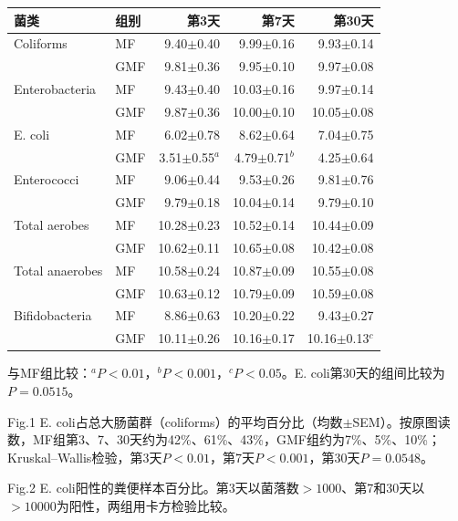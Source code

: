\begin{center}\small\setlength{\tabcolsep}{3.5pt}\renewcommand{\arraystretch}{1.18}\begin{tabular}{@{}llrrr@{}}
\toprule
菌类 & 组别 & 第3天 & 第7天 & 第30天 \\
\midrule
Coliforms & MF & 9.40\(\pm\)0.40 & 9.99\(\pm\)0.16 & 9.93\(\pm\)0.14 \\
 & GMF & 9.81\(\pm\)0.36 & 9.95\(\pm\)0.10 & 9.97\(\pm\)0.08 \\
Enterobacteria & MF & 9.43\(\pm\)0.40 & 10.03\(\pm\)0.16 & 9.97\(\pm\)0.14 \\
 & GMF & 9.87\(\pm\)0.36 & 10.00\(\pm\)0.10 & 10.05\(\pm\)0.08 \\
E. coli & MF & 6.02\(\pm\)0.78 & 8.62\(\pm\)0.64 & 7.04\(\pm\)0.75 \\
 & GMF & 3.51\(\pm\)0.55\(^{a}\) & 4.79\(\pm\)0.71\(^{b}\) & 4.25\(\pm\)0.64 \\
Enterococci & MF & 9.06\(\pm\)0.44 & 9.53\(\pm\)0.26 & 9.81\(\pm\)0.76 \\
 & GMF & 9.79\(\pm\)0.18 & 10.04\(\pm\)0.14 & 9.79\(\pm\)0.10 \\
Total aerobes & MF & 10.28\(\pm\)0.23 & 10.52\(\pm\)0.14 & 10.44\(\pm\)0.09 \\
 & GMF & 10.62\(\pm\)0.11 & 10.65\(\pm\)0.08 & 10.42\(\pm\)0.08 \\
Total anaerobes & MF & 10.58\(\pm\)0.24 & 10.87\(\pm\)0.09 & 10.55\(\pm\)0.08 \\
 & GMF & 10.63\(\pm\)0.12 & 10.79\(\pm\)0.09 & 10.59\(\pm\)0.08 \\
Bifidobacteria & MF & 8.86\(\pm\)0.63 & 10.20\(\pm\)0.22 & 9.43\(\pm\)0.27 \\
 & GMF & 10.11\(\pm\)0.26 & 10.16\(\pm\)0.17 & 10.16\(\pm\)0.13\(^{c}\) \\
\bottomrule\end{tabular}\end{center}

与MF组比较：\(^{a}P<0.01\)，\(^{b}P<0.001\)，\(^{c}P<0.05\)。E. coli第30天的组间比较为\(P=0.0515\)。

Fig.1 \quad E. coli占总大肠菌群（coliforms）的平均百分比（均数\(\pm\)SEM）。按原图读数，MF组第3、7、30天约为42\%、61\%、43\%，GMF组约为7\%、5\%、10\%；Kruskal--Wallis检验，第3天\(P<0.01\)，第7天\(P<0.001\)，第30天\(P=0.0548\)。

Fig.2 \quad E. coli阳性的粪便样本百分比。第3天以菌落数\(>1000\)、第7和30天以\(>10000\)为阳性，两组用卡方检验比较。

